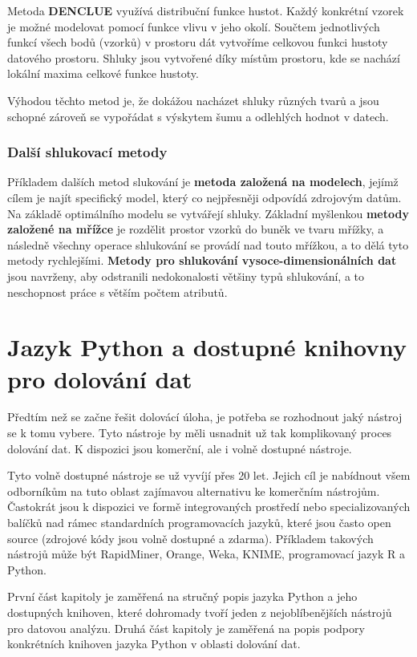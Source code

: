 Metoda \textbf{DENCLUE} využívá distribuční funkce hustot. Každý konkrétní vzorek je možné modelovat pomocí funkce vlivu v jeho okolí. Součtem jednotlivých funkcí všech bodů (vzorků) v prostoru dát vytvoříme celkovou funkci hustoty datového prostoru. Shluky jsou vytvořené díky místům prostoru, kde se nachází lokální maxima celkové funkce hustoty. \cite{Han}

Výhodou těchto metod je, že dokážou nacházet shluky různých tvarů a jsou schopné zároveň se vypořádat s výskytem šumu a odlehlých hodnot v datech. 

\subsection*{Další shlukovací metody}
Příkladem dalších metod slukování je \textbf{metoda založená na modelech}, jejímž cílem je najít specifický model, který co nejpřesněji odpovídá zdrojovým datům. Na základě optimálního modelu se vytvářejí shluky. Základní myšlenkou \textbf{metody založené na mřížce} je rozdělit prostor vzorků do buněk ve tvaru mřížky, a následně všechny operace shlukování se provádí nad touto mřížkou, a to dělá tyto metody rychlejšími. \textbf{Metody pro shlukování vysoce-dimensionálních dat} jsou navrženy, aby odstranili nedokonalosti většiny typů shlukování, a to neschopnost práce s větším počtem atributů. \cite{Han}

\chapter{Jazyk Python a dostupné knihovny pro dolování dat}
\label{python}
Předtím než se začne řešit dolovácí úloha, je potřeba se rozhodnout jaký nástroj se k tomu vybere. Tyto nástroje by měli usnadnit už tak komplikovaný proces dolování dat. K dispozici jsou komerční, ale i volně dostupné nástroje. 

Tyto volně dostupné nástroje se už vyvíjí přes 20 let. Jejich cíl je nabídnout všem odborníkům na tuto oblast zajímavou alternativu ke komerčním nástrojům. Častokrát jsou k dispozici ve formě integrovaných prostředí nebo specializovaných balíčků nad rámec standardních programovacích jazyků, které jsou často open source (zdrojové kódy jsou volně dostupné a zdarma). Příkladem takových nástrojů může být RapidMiner, Orange, Weka, KNIME, programovací jazyk R a Python.  \cite{Jovic1}

První část kapitoly je zaměřená na stručný popis jazyka Python a jeho dostupných knihoven, které dohromady tvoří jeden z nejoblíbenějších nástrojů pro datovou analýzu. Druhá část kapitoly je zaměřená na popis podpory konkrétních knihoven jazyka Python v oblasti dolování dat.

